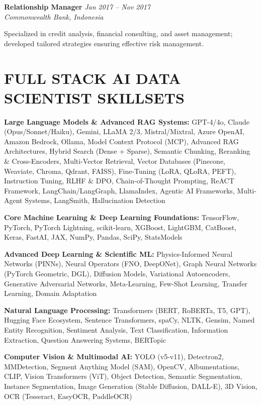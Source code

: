 \documentclass[10pt,a4paper]{article}
\newcommand{\experience}[4]{%
    \noindent\textbf{#1} \hfill \textit{#2}\\
    \textit{#3} \hfill #4\vspace{2pt}
}
\begin{document}
\vspace{4pt}

\experience{Relationship Manager}{Jan 2017 -- Nov 2017}{Commonwealth Bank, Indonesia}{}

Specialized in credit analysis, financial consulting, and asset management; developed tailored strategies ensuring effective risk management.

\vspace{2pt}

\section*{FULL STACK AI DATA SCIENTIST SKILLSETS}

\textbf{Large Language Models \& Advanced RAG Systems:} GPT-4/4o, Claude (Opus/Sonnet/Haiku), Gemini, LLaMA 2/3, Mistral/Mixtral, Azure OpenAI, Amazon Bedrock, Ollama, Model Context Protocol (MCP), Advanced RAG Architectures, Hybrid Search (Dense + Sparse), Semantic Chunking, Reranking \& Cross-Encoders, Multi-Vector Retrieval, Vector Databases (Pinecone, Weaviate, Chroma, Qdrant, FAISS), Fine-Tuning (LoRA, QLoRA, PEFT), Instruction Tuning, RLHF \& DPO, Chain-of-Thought Prompting, ReACT Framework, LangChain/LangGraph, LlamaIndex, Agentic AI Frameworks, Multi-Agent Systems, LangSmith, Hallucination Detection

\textbf{Core Machine Learning \& Deep Learning Foundations:} TensorFlow, PyTorch, PyTorch Lightning, scikit-learn, XGBoost, LightGBM, CatBoost, Keras, FastAI, JAX, NumPy, Pandas, SciPy, StatsModels

\textbf{Advanced Deep Learning \& Scientific ML:} Physics-Informed Neural Networks (PINNs), Neural Operators (FNO, DeepONet), Graph Neural Networks (PyTorch Geometric, DGL), Diffusion Models, Variational Autoencoders, Generative Adversarial Networks, Meta-Learning, Few-Shot Learning, Transfer Learning, Domain Adaptation

\textbf{Natural Language Processing:} Transformers (BERT, RoBERTa, T5, GPT), Hugging Face Ecosystem, Sentence Transformers, spaCy, NLTK, Gensim, Named Entity Recognition, Sentiment Analysis, Text Classification, Information Extraction, Question Answering Systems, BERTopic

\textbf{Computer Vision \& Multimodal AI:} YOLO (v5-v11), Detectron2, MMDetection, Segment Anything Model (SAM), OpenCV, Albumentations, CLIP, Vision Transformers (ViT), Object Detection, Semantic Segmentation, Instance Segmentation, Image Generation (Stable Diffusion, DALL-E), 3D Vision, OCR (Tesseract, EasyOCR, PaddleOCR)
\end{document}
